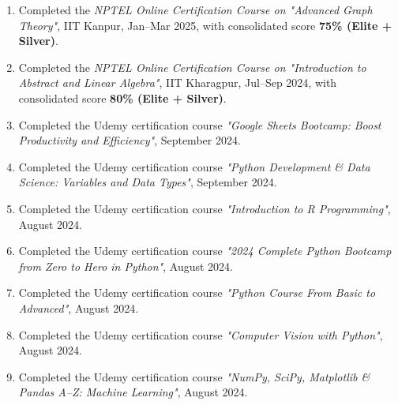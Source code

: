 \begin{enumerate}[label=\protect\circled{\arabic*}, leftmargin=*, itemsep=1ex]
\item Completed the \emph{NPTEL Online Certification Course on "Advanced Graph Theory"}, IIT Kanpur, Jan--Mar 2025, with consolidated score \textbf{75\% (Elite + Silver)}.
\item Completed the \emph{NPTEL Online Certification Course on "Introduction to Abstract and Linear Algebra"}, IIT Kharagpur, Jul--Sep 2024, with consolidated score \textbf{80\% (Elite + Silver)}.
\item Completed the Udemy certification course \emph{"Google Sheets Bootcamp: Boost Productivity and Efficiency"}, September 2024.
\item Completed the Udemy certification course \emph{"Python Development \& Data Science: Variables and Data Types"}, September 2024.
\item Completed the Udemy certification course \emph{"Introduction to R Programming"}, August 2024.
\item Completed the Udemy certification course \emph{"2024 Complete Python Bootcamp from Zero to Hero in Python"}, August 2024.
\item Completed the Udemy certification course \emph{"Python Course From Basic to Advanced"}, August 2024.
\item Completed the Udemy certification course \emph{"Computer Vision with Python"}, August 2024.
\item Completed the Udemy certification course \emph{"NumPy, SciPy, Matplotlib \& Pandas A--Z: Machine Learning"}, August 2024.
\end{enumerate}
